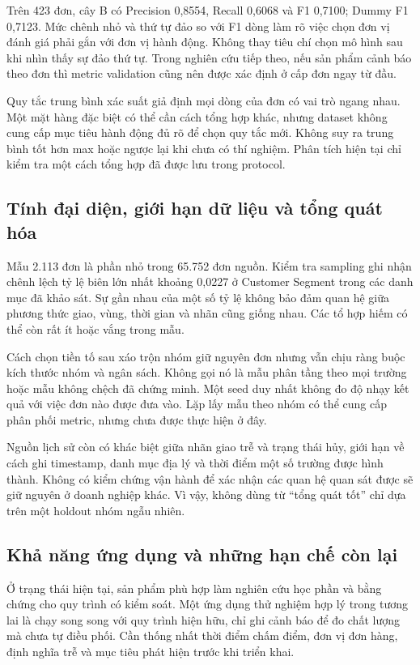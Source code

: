 Trên 423 đơn, cây B có Precision 0,8554, Recall 0,6068 và F1 0,7100;
Dummy F1 0,7123. Mức chênh nhỏ và thứ tự đảo so với F1 dòng làm rõ việc
chọn đơn vị đánh giá phải gắn với đơn vị hành động. Không thay tiêu chí
chọn mô hình sau khi nhìn thấy sự đảo thứ tự. Trong nghiên cứu tiếp theo,
nếu sản phẩm cảnh báo theo đơn thì metric validation cũng nên được xác
định ở cấp đơn ngay từ đầu.

Quy tắc trung bình xác suất giả định mọi dòng của đơn có vai trò ngang
nhau. Một mặt hàng đặc biệt có thể cần cách tổng hợp khác, nhưng dataset
không cung cấp mục tiêu hành động đủ rõ để chọn quy tắc mới. Không suy
ra trung bình tốt hơn max hoặc ngược lại khi chưa có thí nghiệm. Phân
tích hiện tại chỉ kiểm tra một cách tổng hợp đã được lưu trong protocol.

\subsection{Tính đại diện, giới hạn dữ liệu và tổng quát hóa}
Mẫu 2.113 đơn là phần nhỏ trong 65.752 đơn nguồn. Kiểm tra sampling ghi
nhận chênh lệch tỷ lệ biên lớn nhất khoảng 0,0227 ở Customer Segment
trong các danh mục đã khảo sát. Sự gần nhau của một số tỷ lệ không bảo
đảm quan hệ giữa phương thức giao, vùng, thời gian và nhãn cũng giống
nhau. Các tổ hợp hiếm có thể còn rất ít hoặc vắng trong mẫu.

Cách chọn tiền tố sau xáo trộn nhóm giữ nguyên đơn nhưng vẫn chịu ràng
buộc kích thước nhóm và ngân sách. Không gọi nó là mẫu phân tầng theo
mọi trường hoặc mẫu không chệch đã chứng minh. Một seed duy nhất không
đo độ nhạy kết quả với việc đơn nào được đưa vào. Lặp lấy mẫu theo nhóm
có thể cung cấp phân phối metric, nhưng chưa được thực hiện ở đây.

Nguồn lịch sử còn có khác biệt giữa nhãn giao trễ và trạng thái hủy,
giới hạn về cách ghi timestamp, danh mục địa lý và thời điểm một số trường
được hình thành. Không có kiểm chứng vận hành để xác nhận các quan hệ
quan sát được sẽ giữ nguyên ở doanh nghiệp khác. Vì vậy, không dùng từ
``tổng quát tốt'' chỉ dựa trên một holdout nhóm ngẫu nhiên.

\subsection{Khả năng ứng dụng và những hạn chế còn lại}
Ở trạng thái hiện tại, sản phẩm phù hợp làm nghiên cứu học phần và bằng
chứng cho quy trình có kiểm soát. Một ứng dụng thử nghiệm hợp lý trong
tương lai là chạy song song với quy trình hiện hữu, chỉ ghi cảnh báo để
đo chất lượng mà chưa tự điều phối. Cần thống nhất thời điểm chấm điểm,
đơn vị đơn hàng, định nghĩa trễ và mục tiêu phát hiện trước khi triển khai.

